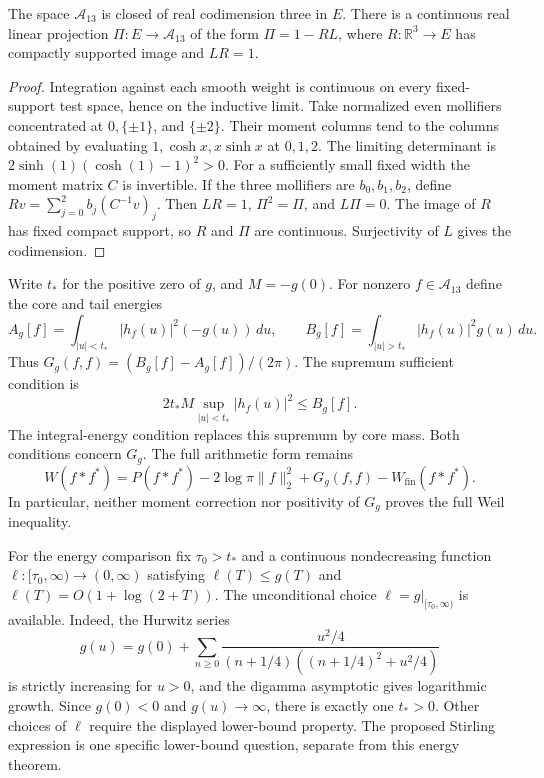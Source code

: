 \begin{lemma}
\label{v4-arith:consumer75:moment-projection}
The space $\mathscr A_{13}$ is closed of real codimension three in $E$.
There is a continuous real linear projection
$\Pi:E\to\mathscr A_{13}$ of the form $\Pi=1-RL$,
where $R:\mathbb R^3\to E$ has compactly supported image and $LR=1$.
\end{lemma}
\begin{proof}
Integration against each smooth weight is continuous on every
fixed-support test space, hence on the inductive limit.
Take normalized even mollifiers concentrated at $0,\{\pm1\}$,
and $\{\pm2\}$. Their moment columns tend to the columns obtained
by evaluating $1,\cosh x,x\sinh x$ at $0,1,2$.
The limiting determinant is
$2\sinh(1)(\cosh(1)-1)^2>0$.
For a sufficiently small fixed width the moment matrix $C$ is
invertible. If the three mollifiers are $b_0,b_1,b_2$, define
$Rv=\sum_{j=0}^2b_j(C^{-1}v)_j$.
Then $LR=1$, $\Pi^2=\Pi$, and $L\Pi=0$.
The image of $R$ has fixed compact support, so $R$ and $\Pi$ are
continuous. Surjectivity of $L$ gives the codimension.
\end{proof}

Write $t_*$ for the positive zero of $g$, and $M=-g(0)$.
For nonzero $f\in\mathscr A_{13}$ define the core and tail energies
\[
 A_g[f]=\int_{|u|<t_*}|h_f(u)|^2(-g(u))\,du,\qquad
 B_g[f]=\int_{|u|>t_*}|h_f(u)|^2g(u)\,du.
\]
Thus $G_g(f,f)=(B_g[f]-A_g[f])/(2\pi)$.
The supremum sufficient condition is
\[
 2t_*M\sup_{|u|<t_*}|h_f(u)|^2\le B_g[f].
\]
The integral-energy condition replaces this supremum by core mass.
Both conditions concern $G_g$. The full arithmetic form remains
\[
 W(f*f^*)=P(f*f^*)-2\log\pi\|f\|_2^2
                  +G_g(f,f)-W_{\mathrm{fin}}(f*f^*).
\]
In particular, neither moment correction nor positivity of $G_g$
proves the full Weil inequality.


For the energy comparison fix $\tau_0>t_*$ and a continuous
nondecreasing function $\ell:[\tau_0,\infty)\to(0,\infty)$ satisfying
$\ell(T)\le g(T)$ and $\ell(T)=O(1+\log(2+T))$.
The unconditional choice $\ell=g|_{[\tau_0,\infty)}$ is available.
Indeed, the Hurwitz series
\[
 g(u)=g(0)+\sum_{n\ge0}\frac{u^2/4}
 {(n+1/4)((n+1/4)^2+u^2/4)}
\]
is strictly increasing for $u>0$, and the digamma asymptotic gives
logarithmic growth. Since $g(0)<0$ and $g(u)\to\infty$, there is
exactly one $t_*>0$. Other choices of $\ell$ require the displayed
lower-bound property. The proposed Stirling expression is one
specific lower-bound question, separate from this energy theorem.
